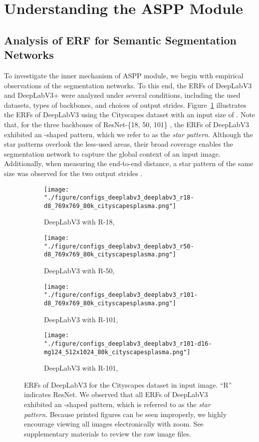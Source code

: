 \documentclass{article}
\def\figref#1{Figure~\ref{#1}}
\begin{document}
\section{Understanding the ASPP Module}
\label{sec:understanding}

\subsection{Analysis of ERF for Semantic Segmentation Networks}
\label{sec:analsis}

To investigate the inner mechanism of ASPP module, we begin with empirical observations of the segmentation networks. To this end, the ERFs of DeepLabV3 and DeepLabV3+ were analyzed under several conditions, including the used datasets, types of backbones, and choices of output strides. \figref{fig:d3} illustrates the ERFs of DeepLabV3 using the Cityscapes dataset \citep{DBLP:conf/cvpr/CordtsORREBFRS16} with an input size of . Note that, for the three backbones of ResNet-\{18, 50, 101\} \citep{DBLP:conf/cvpr/HeZRS16}, the ERFs of DeepLabV3 exhibited an \EightStarTaper-shaped pattern, which we refer to as the \textit{star pattern}. Although the star patterns overlook the less-used areas, their broad coverage enables the segmentation network to capture the global context of an input image. Additionally, when measuring the end-to-end distance, a star pattern of the same size was observed for the two output strides .

\begin{figure}[t!]
	\centering
	\begin{subfigure}[b]{0.241\linewidth}
		\centering
		\texttt{[image: "./figure/configs\_deeplabv3\_deeplabv3\_r18-d8\_769x769\_80k\_cityscapesplasma.png"]}
		\caption{DeepLabV3 with R-18, }
	\end{subfigure}
	\hfill
	\begin{subfigure}[b]{0.241\linewidth}
		\centering
		\texttt{[image: "./figure/configs\_deeplabv3\_deeplabv3\_r50-d8\_769x769\_80k\_cityscapesplasma.png"]}
		\caption{DeepLabV3 with R-50, }
	\end{subfigure}
	\hfill
	\begin{subfigure}[b]{0.241\linewidth}
		\centering
		\texttt{[image: "./figure/configs\_deeplabv3\_deeplabv3\_r101-d8\_769x769\_80k\_cityscapesplasma.png"]}
		\caption{DeepLabV3 with R-101, }
	\end{subfigure}
	\hfill
	\begin{subfigure}[b]{0.241\linewidth}
		\centering
		\texttt{[image: "./figure/configs\_deeplabv3\_deeplabv3\_r101-d16-mg124\_512x1024\_80k\_cityscapesplasma.png"]}
		\caption{DeepLabV3 with R-101, }
	\end{subfigure}
	\caption{ERFs of DeepLabV3 for the Cityscapes dataset in  input image. ``R'' indicates ResNet. We observed that all ERFs of DeepLabV3 exhibited an \EightStarTaper-shaped pattern, which is referred to as the \textit{star pattern}. Because printed figures can be seen improperly, we highly encourage viewing all images electronically with zoom. See supplementary materials to review the raw image files.}
	\label{fig:d3}
\end{figure}
\end{document}
